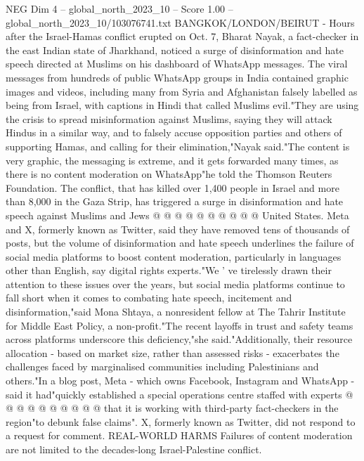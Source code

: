 \begin{textsample}{NEG Dim 4 – global\_north\_2023\_10 – Score 1.00 – global\_north\_2023\_10/103076741.txt}  \label{ex:f4_neg_012}
BANGKOK/LONDON/BEIRUT - Hours after the Israel-Hamas conflict erupted on Oct. 7, Bharat Nayak, a fact-checker in the east Indian state of Jharkhand, noticed a surge of disinformation and hate speech directed at Muslims on his dashboard of WhatsApp messages.
The viral messages from hundreds of public WhatsApp groups in India contained graphic images and videos, including many from Syria and Afghanistan falsely labelled as being from Israel, with captions in Hindi that called Muslims evil."They are using the crisis to spread misinformation against Muslims, saying they will attack Hindus in a similar way, and to falsely accuse opposition parties and others of supporting Hamas, and calling for their elimination,"Nayak said."The content is very graphic, the messaging is extreme, and it gets forwarded many times, as there is no content moderation on WhatsApp"he told the Thomson Reuters Foundation.
The conflict, that has killed over 1,400 people in Israel and more than 8,000 in the Gaza Strip, has triggered a surge in disinformation and hate speech against Muslims and Jews @ @ @ @ @ @ @ @ @ @ United States.
Meta and X, formerly known as Twitter, said they have removed tens of thousands of posts, but the volume of disinformation and hate speech underlines the failure of social media platforms to boost content moderation, particularly in languages other than English, say digital rights experts."We ' ve tirelessly drawn their attention to these issues over the years, but social media platforms continue to fall short when it comes to combating hate speech, incitement and disinformation,"said Mona Shtaya, a nonresident fellow at The Tahrir Institute for Middle East Policy, a non-profit."The recent layoffs in trust and safety teams across platforms underscore this deficiency,"she said."Additionally, their resource allocation - based on market size, rather than assessed risks - exacerbates the challenges faced by marginalised communities including Palestinians and others."In a blog post, Meta - which owns Facebook, Instagram and WhatsApp - said it had"quickly established a special operations centre staffed with experts @ @ @ @ @ @ @ @ @ @ that it is working with third-party fact-checkers in the region"to debunk false claims".
X, formerly known as Twitter, did not respond to a request for comment.
REAL-WORLD HARMS Failures of content moderation are not limited to the decades-long Israel-Palestine conflict.

\end{textsample}
